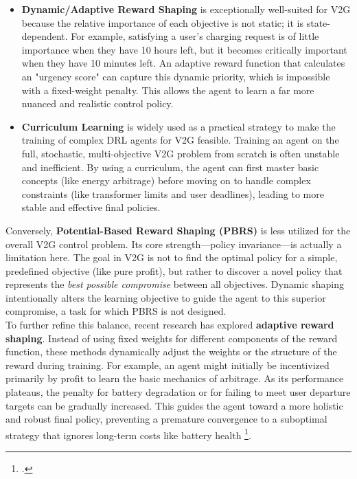 \begin{itemize}
    \item \textbf{Dynamic/Adaptive Reward Shaping} is exceptionally well-suited for V2G because the relative importance of each objective is not static; it is state-dependent. For example, satisfying a user's charging request is of little importance when they have 10 hours left, but it becomes critically important when they have 10 minutes left. An adaptive reward function that calculates an "urgency score" can capture this dynamic priority, which is impossible with a fixed-weight penalty. This allows the agent to learn a far more nuanced and realistic control policy.
    
    \item \textbf{Curriculum Learning} is widely used as a practical strategy to make the training of complex DRL agents for V2G feasible. Training an agent on the full, stochastic, multi-objective V2G problem from scratch is often unstable and inefficient. By using a curriculum, the agent can first master basic concepts (like energy arbitrage) before moving on to handle complex constraints (like transformer limits and user deadlines), leading to more stable and effective final policies.
\end{itemize}
\noindent
Conversely, \textbf{Potential-Based Reward Shaping (PBRS)} is less utilized for the overall V2G control problem. Its core strength—policy invariance—is actually a limitation here. The goal in V2G is not to find the optimal policy for a simple, predefined objective (like pure profit), but rather to discover a novel policy that represents the \textit{best possible compromise} between all objectives. Dynamic shaping intentionally alters the learning objective to guide the agent to this superior compromise, a task for which PBRS is not designed.
\\
To further refine this balance, recent research has explored \textbf{adaptive reward shaping}. Instead of using fixed weights for different components of the reward function, these methods dynamically adjust the weights or the structure of the reward during training. For example, an agent might initially be incentivized primarily by profit to learn the basic mechanics of arbitrage. As its performance plateaus, the penalty for battery degradation or for failing to meet user departure targets can be gradually increased. This guides the agent toward a more holistic and robust final policy, preventing a premature convergence to a suboptimal strategy that ignores long-term costs like battery health \footcite{wan2022dynamic}.